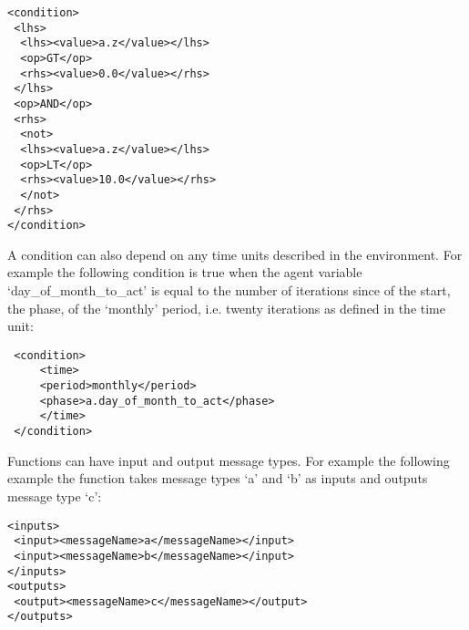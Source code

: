 \begin{mylisting}
\begin{verbatim}
<condition>
 <lhs>
  <lhs><value>a.z</value></lhs>
  <op>GT</op>
  <rhs><value>0.0</value></rhs>
 </lhs>
 <op>AND</op>
 <rhs>
  <not>
  <lhs><value>a.z</value></lhs>
  <op>LT</op>
  <rhs><value>10.0</value></rhs>
  </not>
 </rhs>
</condition>
\end{verbatim}
\end{mylisting}

A condition can also depend on any time units described in the environment. For
example the following condition is true when the agent variable
`day\_of\_month\_to\_act' is equal to the number of iterations since of the
start, the phase, of the `monthly' period, i.e. twenty iterations as defined in
the time unit:

\begin{mylisting}
\begin{verbatim}
 <condition>
     <time>
     <period>monthly</period>
     <phase>a.day_of_month_to_act</phase>
     </time>
 </condition>
\end{verbatim}
\end{mylisting}

%
%

Functions can have input and output message types. For example the following
example the function takes message types `a' and `b' as inputs and outputs
message type `c':

\begin{mylisting}
\begin{verbatim}
<inputs>
 <input><messageName>a</messageName></input>
 <input><messageName>b</messageName></input>
</inputs>
<outputs>
 <output><messageName>c</messageName></output>
</outputs>
\end{verbatim}
\end{mylisting}


